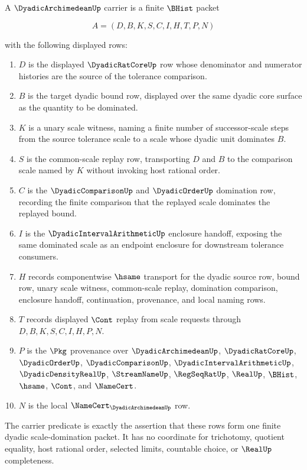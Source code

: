 \begin{definition}
\label{def:dyadic-archimedean-carrier}
A $\DyadicArchimedeanUp$ carrier is a finite $\BHist$ packet

$$
A=(D,B,K,S,C,I,H,T,P,N)
$$

with the following displayed rows:
\begin{enumerate}
\item $D$ is the displayed $\DyadicRatCoreUp$ row whose denominator and numerator histories are the source of the tolerance comparison.
\item $B$ is the target dyadic bound row, displayed over the same dyadic core surface as the quantity to be dominated.
\item $K$ is a unary scale witness, naming a finite number of successor-scale steps from the source tolerance scale to a scale whose dyadic unit dominates $B$.
\item $S$ is the common-scale replay row, transporting $D$ and $B$ to the comparison scale named by $K$ without invoking host rational order.
\item $C$ is the $\DyadicComparisonUp$ and $\DyadicOrderUp$ domination row, recording the finite comparison that the replayed scale dominates the replayed bound.
\item $I$ is the $\DyadicIntervalArithmeticUp$ enclosure handoff, exposing the same dominated scale as an endpoint enclosure for downstream tolerance consumers.
\item $H$ records componentwise $\hsame$ transport for the dyadic source row, bound row, unary scale witness, common-scale replay, domination comparison, enclosure handoff, continuation, provenance, and local naming rows.
\item $T$ records displayed $\Cont$ replay from scale requests through $D,B,K,S,C,I,H,P,N$.
\item $P$ is the $\Pkg$ provenance over $\DyadicArchimedeanUp$, $\DyadicRatCoreUp$, $\DyadicOrderUp$, $\DyadicComparisonUp$, $\DyadicIntervalArithmeticUp$, $\DyadicDensityRealUp$, $\StreamNameUp$, $\RegSeqRatUp$, $\RealUp$, $\BHist$, $\hsame$, $\Cont$, and $\NameCert$.
\item $N$ is the local $\NameCert_{\DyadicArchimedeanUp}$ row.
\end{enumerate}
The carrier predicate is exactly the assertion that these rows form one finite dyadic scale-domination packet. It has no coordinate for trichotomy, quotient equality, host rational order, selected limits, countable choice, or $\RealUp$ completeness.
\end{definition}

